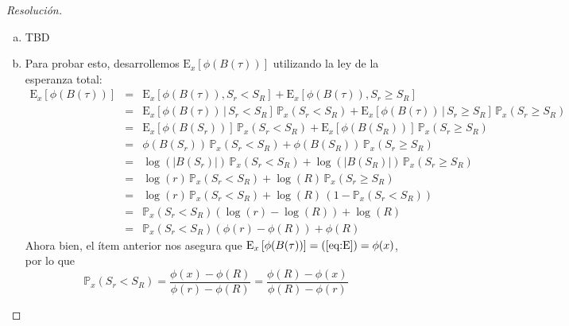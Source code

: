 \documentclass[a4paper,11pt]{article}
\newcommand{\abs}[1]{\ensuremath{\left\lvert #1 \right\rvert}}
\newcommand{\Probx}[2]{\ensuremath{\mathbb{P}_{#1} \left( #2 \right)}}
\newcommand{\Expx}[2]{\ensuremath{\textrm{E}_{#1}\left[#2\right]}}
\newcommand{\ExpxC}[3]{\ensuremath{\textrm{E}_{#1}\left[#2 \, | \, #3\right]}}
\begin{document}
\begin{proof}[Resoluci\'on]
$ $ 
\begin{enumerate}[a.]
    \item TBD
    
    \item Para probar esto, desarrollemos $\Expx{x}{\phi(B(\tau))}$ utilizando la ley
    de la esperanza total:
    \begin{eqnarray}
        \Expx{x}{\phi(B(\tau))}
            &=& \Expx{x}{\phi(B(\tau)), S_r < S_R} + 
                \Expx{x}{\phi(B(\tau)), S_r \geq S_R} \nonumber \\
            &=& \ExpxC{x}{\phi(B(\tau))}{S_r < S_R} \, \Probx{x}{S_r < S_R} +
                \ExpxC{x}{\phi(B(\tau))}{S_r \geq S_R} \, \Probx{x}{S_r \geq S_R} \nonumber \\
            &=& \Expx{x}{\phi(B(S_r))}\, \Probx{x}{S_r < S_R} +
                \Expx{x}{\phi(B(S_R))}\, \Probx{x}{S_r \geq S_R} \nonumber \\
            &=& \phi(B(S_r))\, \Probx{x}{S_r < S_R} +
                \phi(B(S_R))\, \Probx{x}{S_r \geq S_R} \nonumber \\
            &=& \log(\abs{B(S_r)})\, \Probx{x}{S_r < S_R} +
                \log(\abs{B(S_R)})\, \Probx{x}{S_r \geq S_R} \nonumber \\
            &=& \log(r)\, \Probx{x}{S_r < S_R} +
                \log(R)\, \Probx{x}{S_r \geq S_R} \nonumber \\
            &=& \log(r)\, \Probx{x}{S_r < S_R} +
                \log(R)\, (1 - \Probx{x}{S_r < S_R}) \nonumber \\
            &=& \Probx{x}{S_r < S_R} (\log(r) - \log(R)) + \log(R) \nonumber \\
            &=& \Probx{x}{S_r < S_R} (\phi(r) - \phi(R)) + \phi(R) \label{eq:E}
    \end{eqnarray}
    Ahora bien, el ítem anterior nos asegura que $\Expx{x}{\phi(B(\tau))} = (\ref{eq:E}) = \phi(x)$,
    por lo que
    $$\Probx{x}{S_r < S_R} = \frac{\phi(x) - \phi(R)}{\phi(r) - \phi(R)} 
        = \frac{\phi(R) - \phi(x)}{\phi(R) - \phi(r)}$$
\end{enumerate}
\end{proof}
\end{document}
